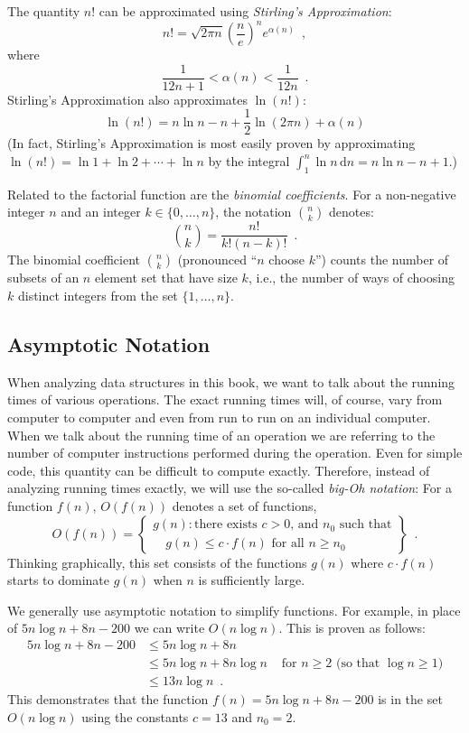 \documentclass[10pt]{book}
\theoremstyle{plain}
\theoremstyle{definition}
\begin{document}
%
The quantity $n!$ can be approximated using \emph{Stirling's Approximation}:
\[
	n! 
   = \sqrt{2\pi n}\left(\frac{n}{e}\right)^{n}e^{\alpha(n)} \enspace ,
\]
where
\[  
   \frac{1}{12n+1} <  \alpha(n) < \frac{1}{12n}  \enspace .
\]
Stirling's Approximation also approximates $\ln(n!)$:
\[
   \ln(n!) = n\ln n - n + \frac{1}{2}\ln(2\pi n) + \alpha(n)
\]
(In fact, Stirling's Approximation is most easily proven by approximating
$\ln(n!)=\ln 1 + \ln 2  + \cdots + \ln n$ by the integral
$\int_1^n \ln n\,\mathrm{d}n = n\ln n - n +1$.)

%
Related to the factorial function are the \emph{binomial coefficients}.
For a non-negative integer $n$ and an integer $k\in\{0,\ldots,n\}$,
the notation $\binom{n}{k}$ denotes:
\[
   \binom{n}{k} = \frac{n!}{k!(n-k)!} \enspace .
\]
The binomial coefficient $\binom{n}{k}$ (pronounced ``$n$ choose $k$'')
counts the number of subsets of an $n$ element set that have size $k$,
i.e., the number of ways of choosing $k$ distinct integers from the
set $\{1,\ldots,n\}$.

\subsection{Asymptotic Notation}

%
%
%
When analyzing data structures in this book, we want to talk about
the running times of various operations.  The exact running times will,
of course, vary from computer to computer and even from run to run on an
individual computer.  When we talk about the running time of an operation
we are referring to the number of computer instructions performed during
the operation.  Even for simple code, this quantity can be difficult to
compute exactly.  Therefore, instead of analyzing running times exactly,
we will use the so-called \emph{big-Oh notation}: For a function $f(n)$,
$O(f(n))$ denotes a set of functions,
\[
   O(f(n)) = \left\{
     \begin{array}{l}
       g(n):\mbox{there exists $c>0$, and $n_0$ such that} \\
             \quad\mbox{$g(n) \le c\cdot f(n)$ for all $n\ge n_0$}   
     \end{array} \right\} \enspace .
\]
Thinking graphically, this set consists of the functions $g(n)$ where
$c\cdot f(n)$ starts to dominate $g(n)$ when $n$ is sufficiently large.

We generally use asymptotic notation to simplify functions.  For example,
in place of $5n\log n + 8n - 200$ we can write $O(n\log n)$.
This is proven as follows:
\begin{align*} 
       5n\log n + 8n - 200
        & \le 5n\log n + 8n \\
        & \le 5n\log n + 8n\log n & \mbox{ for $n\ge 2$ (so that $\log n \ge 1$)}
            \\
        & \le 13n\log n  \enspace .
\end{align*}
This demonstrates that the function $f(n)=5n\log n + 8n - 200$ is in
the set $O(n\log n)$ using the constants $c=13$ and $n_0 = 2$.
\end{document}
